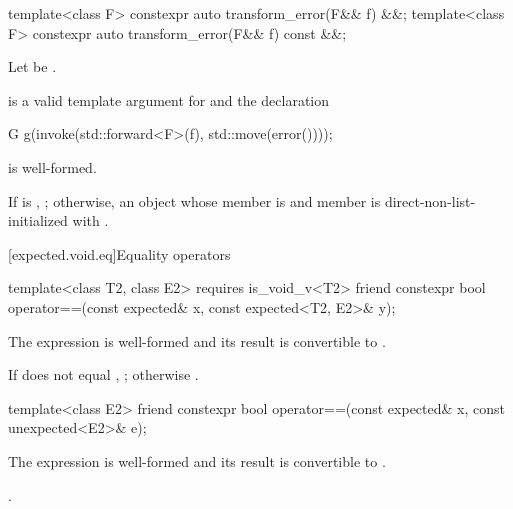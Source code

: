 %
\begin{itemdecl}
template<class F> constexpr auto transform_error(F&& f) &&;
template<class F> constexpr auto transform_error(F&& f) const &&;
\end{itemdecl}

\begin{itemdescr}
\pnum
Let  be
.

\pnum
\mandates
{} is a valid template argument
for  and the declaration
\begin{codeblock}
G g(invoke(std::forward<F>(f), std::move(error())));
\end{codeblock}
is well-formed.

\pnum
\returns
If  is , ; otherwise, an
 object whose  member is 
and  member is direct-non-list-initialized with
.
\end{itemdescr}

[expected.void.eq]{Equality operators}

%
\begin{itemdecl}
template<class T2, class E2> requires is_void_v<T2>
  friend constexpr bool operator==(const expected& x, const expected<T2, E2>& y);
\end{itemdecl}

\begin{itemdescr}
\pnum
\constraints
The expression  is well-formed and
its result is convertible to .

\pnum
\returns
If  does not equal , ;
otherwise .
\end{itemdescr}

%
\begin{itemdecl}
template<class E2>
  friend constexpr bool operator==(const expected& x, const unexpected<E2>& e);
\end{itemdecl}

\begin{itemdescr}
\pnum
\constraints
The expression  is well-formed and
its result is convertible to .

\pnum
\returns
{}.
\end{itemdescr}

